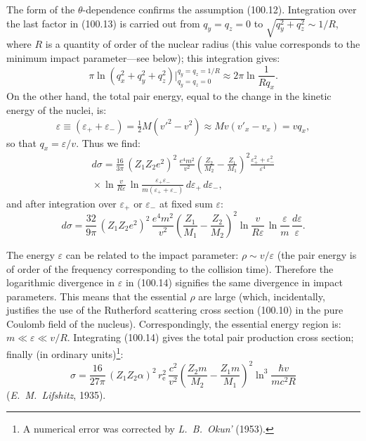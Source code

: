 The form of the $\theta$-dependence confirms the assumption (100.12). Integration over the last factor in (100.13) is carried out from $q_y = q_z = 0$ to $\sqrt{q_y^2 + q_z^2} \sim 1/R$, where $R$ is a quantity of order of the nuclear radius (this value corresponds to the minimum impact parameter---see below); this integration gives:
\[
\pi\ln(q_x^2 + q_y^2 + q_z^2)\Big|_{q_y=q_z=0}^{q_y=q_z=1/R} \approx 2\pi\ln\frac{1}{Rq_x}.
\]
On the other hand, the total pair energy, equal to the change in the kinetic energy of the nuclei, is:
\[
\varepsilon \equiv (\varepsilon_+ + \varepsilon_-) = \tfrac{1}{2}M(v'^2 - v^2) \approx Mv(v'_x - v_x) = vq_x,
\]
so that $q_x = \varepsilon/v$. Thus we find:
\begin{multline*}
d\sigma = \frac{16}{3\pi}\,(Z_1 Z_2 e^2)^2\,\frac{e^4 m^2}{v^2}\!\left(\frac{Z_2}{M_2} - \frac{Z_1}{M_1}\right)^{\!2}\frac{\varepsilon_+^2 + \varepsilon_-^2}{\varepsilon^4} \\
{}\times \ln\frac{v}{R\varepsilon}\,\ln\frac{\varepsilon_+\varepsilon_-}{m(\varepsilon_+ + \varepsilon_-)}\,d\varepsilon_+\,d\varepsilon_-,
\end{multline*}
and after integration over $\varepsilon_+$ or $\varepsilon_-$ at fixed sum $\varepsilon$:
\begin{equation}
d\sigma = \frac{32}{9\pi}\,(Z_1 Z_2 e^2)^2\,\frac{e^4 m^2}{v^2}\!\left(\frac{Z_1}{M_1} - \frac{Z_2}{M_2}\right)^{\!2}\ln\frac{v}{R\varepsilon}\,\ln\frac{\varepsilon}{m}\,\frac{d\varepsilon}{\varepsilon}.
\label{eq:100.14}
\end{equation}


The energy $\varepsilon$ can be related to the impact parameter: $\rho \sim v/\varepsilon$ (the pair energy is of order of the frequency corresponding to the collision time). Therefore the logarithmic divergence in $\varepsilon$ in (100.14) signifies the same divergence in impact parameters. This means that the essential $\rho$ are large (which, incidentally, justifies the use of the Rutherford scattering cross section (100.10) in the pure Coulomb field of the nucleus). Correspondingly, the essential energy region is: $m \ll \varepsilon \ll v/R$. Integrating (100.14) gives the total pair production cross section; finally (in ordinary units)\footnote{A numerical error was corrected by \emph{L.~B.~Okun'} (1953).}:
\begin{equation}
\sigma = \frac{16}{27\pi}\,(Z_1 Z_2 \alpha)^2\,r_\mathrm{e}^2\,\frac{c^2}{v^2}\!\left(\frac{Z_2 m}{M_2} - \frac{Z_1 m}{M_1}\right)^{\!2}\ln^3\frac{\hbar v}{mc^2 R}
\label{eq:100.15}
\end{equation}
(\emph{E.~M.~Lifshitz}, 1935).
